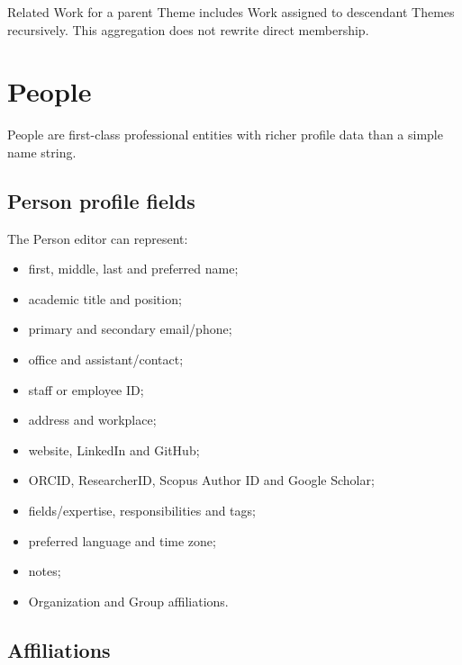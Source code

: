 \documentclass{testudomanual}
\begin{document}
Related Work for a parent Theme includes Work assigned to descendant Themes recursively. This aggregation does not rewrite direct membership.


\chapter{People}

People are first-class professional entities with richer profile data than a simple name string.

\section{Person profile fields}

The Person editor can represent:
\begin{itemize}
    \item first, middle, last and preferred name;
    \item academic title and position;
    \item primary and secondary email/phone;
    \item office and assistant/contact;
    \item staff or employee ID;
    \item address and workplace;
    \item website, LinkedIn and GitHub;
    \item ORCID, ResearcherID, Scopus Author ID and Google Scholar;
    \item fields/expertise, responsibilities and tags;
    \item preferred language and time zone;
    \item notes;
    \item Organization and Group affiliations.
\end{itemize}

\section{Affiliations}
\end{document}
